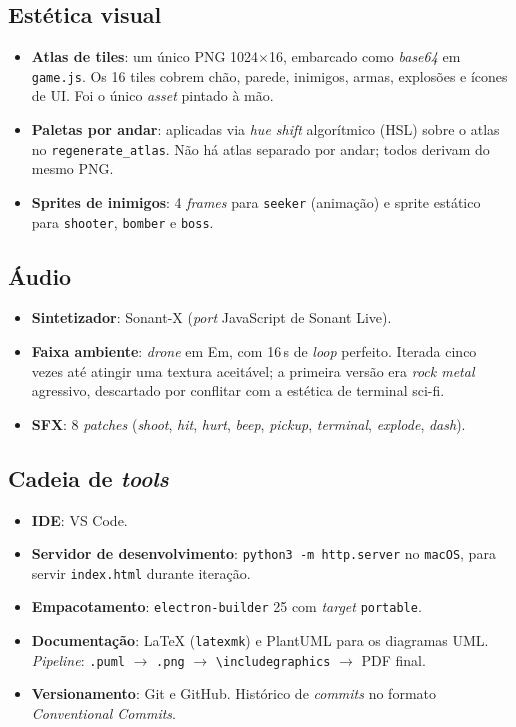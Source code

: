 \subsection{Estética visual}

\begin{itemize}
  \item \textbf{Atlas de tiles}: um único PNG 1024$\times$16, embarcado como
    \emph{base64} em \texttt{game.js}. Os 16 tiles cobrem chão, parede, inimigos,
    armas, explosões e ícones de UI. Foi o único \emph{asset} pintado à mão.
  \item \textbf{Paletas por andar}: aplicadas via \emph{hue shift} algorítmico
    (HSL) sobre o atlas no \texttt{regenerate\_atlas}. Não há atlas separado por
    andar; todos derivam do mesmo PNG.
  \item \textbf{Sprites de inimigos}: 4 \emph{frames} para \texttt{seeker}
    (animação) e sprite estático para \texttt{shooter}, \texttt{bomber} e
    \texttt{boss}.
\end{itemize}

\subsection{Áudio}

\begin{itemize}
  \item \textbf{Sintetizador}: Sonant-X (\emph{port} JavaScript de Sonant Live).
  \item \textbf{Faixa ambiente}: \emph{drone} em Em, com 16\,s de \emph{loop}
    perfeito. Iterada cinco vezes até atingir uma textura aceitável; a primeira
    versão era \emph{rock metal} agressivo, descartado por conflitar com a estética
    de terminal sci-fi.
  \item \textbf{SFX}: 8 \emph{patches} (\emph{shoot}, \emph{hit}, \emph{hurt},
    \emph{beep}, \emph{pickup}, \emph{terminal}, \emph{explode}, \emph{dash}).
\end{itemize}

\subsection{Cadeia de \emph{tools}}

\begin{itemize}
  \item \textbf{IDE}: VS Code.
  \item \textbf{Servidor de desenvolvimento}: \texttt{python3 -m http.server} no
    \texttt{macOS}, para servir \texttt{index.html} durante iteração.
  \item \textbf{Empacotamento}: \texttt{electron-builder} 25 com \emph{target}
    \texttt{portable}.
  \item \textbf{Documentação}: \LaTeX{} (\texttt{latexmk}) e PlantUML para os
    diagramas UML. \emph{Pipeline}: \texttt{.puml} $\to$ \texttt{.png} $\to$
    \texttt{\textbackslash includegraphics} $\to$ PDF final.
  \item \textbf{Versionamento}: Git e GitHub. Histórico de \emph{commits} no
    formato \emph{Conventional Commits}.
\end{itemize}

